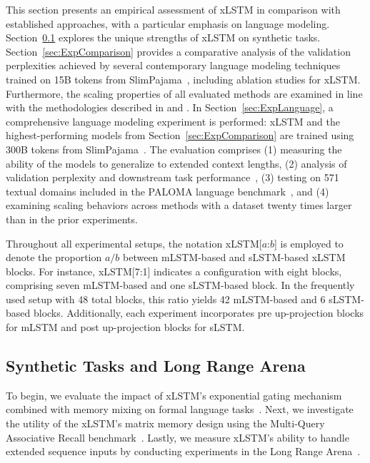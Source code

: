 This section presents an empirical assessment of xLSTM in comparison with established approaches, with a particular emphasis on language modeling. Section~\ref{sec:ExpSyntethic} explores the unique strengths of xLSTM on synthetic tasks. 
Section~\ref{sec:ExpComparison} provides a comparative analysis of the validation perplexities achieved by several contemporary language modeling techniques trained on 15B tokens from SlimPajama~\citep{Soboleva:23}, including ablation studies for xLSTM. Furthermore, the scaling properties of all evaluated methods are examined in line with the methodologies described in \citet{Kaplan:20} and \citet{Brown:20short}.
In Section~\ref{sec:ExpLanguage},
a comprehensive language modeling experiment is performed: xLSTM and the highest-performing models from Section~\ref{sec:ExpComparison} are trained using 300B tokens from SlimPajama~\citep{Soboleva:23}. The evaluation comprises (1) measuring the ability of the models to generalize to extended context lengths, (2) analysis of validation perplexity and downstream task performance~\citep{Sutawika:24}, (3) testing on 571 textual domains included in the PALOMA language benchmark~\citep{Magnusson:23arxivshort}, and (4) examining scaling behaviors across methods with a dataset twenty times larger than in the prior experiments.

\label{sec:xlstm_blocks_notation}
Throughout all experimental setups, the notation xLSTM[$a$:$b$] is employed to denote the proportion $a/b$ between mLSTM-based and sLSTM-based xLSTM blocks. For instance, xLSTM[7:1] indicates a configuration with eight blocks, comprising seven mLSTM-based and one sLSTM-based block. In the frequently used setup with 48 total blocks, this ratio yields 42 mLSTM-based and 6 sLSTM-based blocks. Additionally, each experiment incorporates pre up-projection blocks for mLSTM and post up-projection blocks for sLSTM.

\subsection{Synthetic Tasks and Long Range Arena}
\label{sec:ExpSyntethic}
To begin, we evaluate the impact of xLSTM's exponential gating mechanism combined with memory mixing on formal language tasks~\citep{Deletang:23}. Next, we investigate the utility of the xLSTM's matrix memory design using the Multi-Query Associative Recall benchmark~\citep{Arora:23arxiv}. Lastly, we measure xLSTM's ability to handle extended sequence inputs by conducting experiments in the Long Range Arena~\citep{Tay:21}.

